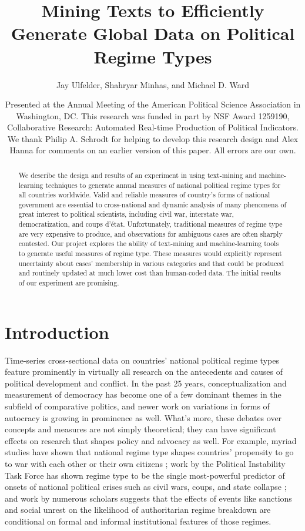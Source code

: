 \documentclass[pdftex,12pt,fullpage,oneside]{amsart}
\title{Mining Texts to Efficiently Generate Global Data on Political Regime Types}
\author{Jay Ulfelder, Shahryar Minhas, and Michael D. Ward}
\date{Presented at the Annual Meeting of the American Political Science Association in Washington, DC. This research was funded in part by NSF Award 1259190, Collaborative Research: Automated Real-time Production of Political Indicators. We thank Philip A. Schrodt for helping to develop this research design and Alex Hanna for comments on an earlier version of this paper. All errors are our own.}
\begin{document}
\maketitle

\singlespacing
\begin{abstract}
We describe the design and results of an experiment in using text-mining and machine-learning techniques to generate annual measures of national political regime types for all countries worldwide. Valid and reliable measures of country's forms of national government are essential to cross-national and dynamic analysis of many phenomena of great interest to political scientists, including civil war, interstate war, democratization, and coups d'\'{e}tat. Unfortunately, traditional measures of regime type are very expensive to produce, and observations for ambiguous cases are often sharply contested. Our project explores the ability of text-mining and machine-learning tools to generate useful measures of regime type. These measures would explicitly represent uncertainty about cases' membership in various categories and that could be produced and routinely updated at much lower cost than human-coded data. The initial results of our experiment are promising.
\end{abstract} 

\newpage
\newpage\setcounter{page}{1} 
\doublespacing

\section{Introduction}

Time-series cross-sectional data on countries' national political regime types feature prominently in virtually all research on the antecedents and causes of political development and conflict. In the past 25 years, conceptualization and measurement of democracy has become one of a few dominant themes in the subfield of comparative politics, and newer work on variations in forms of autocracy is growing in prominence as well. What's more, these debates over concepts and measures are not simply theoretical; they can have significant effects on research that shapes policy and advocacy as well. For example, myriad studies have shown that national regime type shapes countries' propensity to go to war with each other or their own citizens \cite{hegre:2014}; work by the Political Instability Task Force has shown regime type to be the single most-powerful predictor of onsets of national political crises such as civil wars, coups, and state collapse \cite{goldstone2010global}; and work by numerous scholars suggests that the effects of events like sanctions \cite{geddes:2002,escriba-foch:wright:2010} and social unrest \cite{ulfelder:2005} on the likelihood of authoritarian regime breakdown are conditional on formal and informal institutional features of those regimes.
\end{document}
